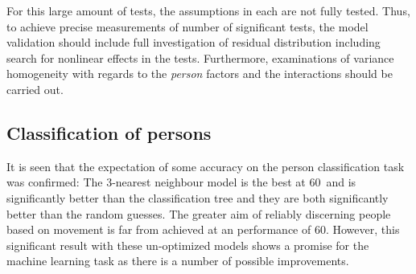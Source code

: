 \documentclass[11pt,fleqn]{article}
\begin{document}
For this large amount of tests, the assumptions in each are not fully tested. 
Thus, to achieve precise measurements of number of significant tests, the model validation should include  full investigation of residual distribution including search for nonlinear effects in the tests.
Furthermore, examinations of variance homogeneity with regards to the \textit{person} factors and the interactions should be carried out. 
%

\subsection{Classification of persons}
It is seen that the expectation of some accuracy on the person classification task was confirmed: The 3-nearest neighbour model is the best at 60\pro\ and is significantly better than the classification tree and they are both significantly better than the random guesses. The greater aim of reliably discerning people based on movement is far from achieved at an performance of 60\pro. However, this significant result with these un-optimized models shows a promise for the machine learning task as there is a number of possible improvements. 
\end{document}
